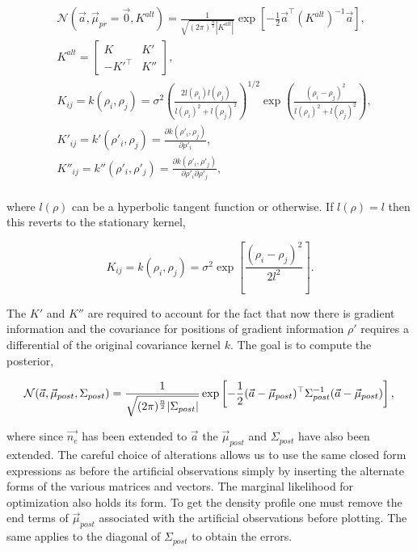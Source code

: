 \begin{equation}
\begin{aligned}
&\mathcal{N}(\vec{a}, \vec \mu_{pr} = \vec{0}, K^{alt}) = \frac{1}{\sqrt{(2\pi)^{\frac{n}{2}}|K^{alt}|}} \exp \left[{{-\frac{1}{2}\vec{a}^\top (K^{alt})^{-1}\vec{a}}}\right],\\
&K^{alt} = \begin{bmatrix} K & K'\\ -K'^\top & K''\end{bmatrix},\\
&K_{ij} = k(\rho_i, \rho_j) = \sigma^2 \left( \frac{2l(\rho_i)l(\rho_j)}{l(\rho_i)^2 + l(\rho_j)^2} \right)^{1/2} \exp\left({\frac{(\rho_i - \rho_j)^2}{l(\rho_i)^2+l(\rho_j)^2}}\right),\\
&K'_{ij} = k'(\rho'_i, \rho_j) = \frac{\partial k{(\rho'_i,\rho_j)}}{\partial \rho'_i},\\
&K''_{ij} = k''(\rho'_i, \rho'_j) = \frac{\partial k{(\rho'_i,\rho'_j)}}{\partial \rho'_i\partial \rho'_j},\\
\end{aligned}
\end{equation}

\noindent where $l(\rho)$ can be a hyperbolic tangent function or otherwise. If $l(\rho) = l$ then this reverts to the stationary kernel,

\begin{equation}
K_{ij} = k(\rho_i, \rho_j) = \sigma^2 \exp\left[{\frac{(\rho_i - \rho_j)^2}{2l^2}}\right].
\end{equation}

\noindent The $K'$  and $K''$ are required to account for the fact that now there is gradient information and the covariance for positions of gradient information $\rho'$ requires a differential of the original covariance kernel $k$. The goal is to compute the posterior,  

\begin{equation}
\mathcal{N}(\vec{a}, \vec{\mu}_{post}, \Sigma_{post}) = \frac{1}{\sqrt{(2\pi)^{\frac{n}{2}}|\Sigma_{post}|}} \exp \left[{{-\frac{1}{2}(\vec{a}-\vec{\mu}_{post})^\top\Sigma_{post}^{-1}(\vec{a}-\vec{\mu}_{post})}}\right],\\
\end{equation}

\noindent where since $\vec{n_e}$ has been extended to $\vec a$ the $\vec{\mu}_{post}$ and $\Sigma_{post}$ have also been extended. The careful choice of alterations allows us to use the same closed form expressions as before the artificial observations simply by inserting the alternate forms of the various matrices and vectors. The marginal likelihood for optimization also holds its form. To get the density profile one must remove the end terms of $\vec{\mu}_{post}$ associated with the artificial observations before plotting. The same applies to the diagonal of $\Sigma_{post}$ to obtain the errors. 